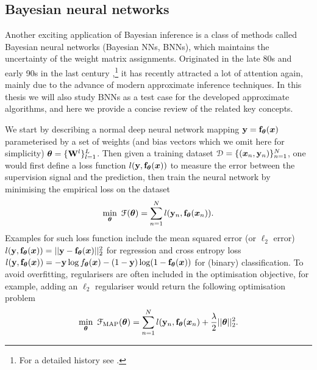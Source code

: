 \subsection{Bayesian neural networks}
\label{sec:chap2_bnn}
Another exciting application of Bayesian inference is a class of methods called Bayesian neural networks (Bayesian NNs, BNNs), which maintains the uncertainty of the weight matrix assignments. Originated in the late 80s and early 90s in the last century \citep{peterson:mean_field1987, mackay:practical1992, neal:bnn1992, hinton:mdl1993, neal:thesis1995},\footnote{For a detailed history see \citep[Section 2.2.1]{gal:uncertainty2016}.} it has recently attracted a lot of attention again, mainly due to the advance of modern approximate inference techniques. In this thesis we will also study BNNs as a test case for the developed approximate algorithms, and here we provide a concise review of the related key concepts. 

We start by describing a normal deep neural network mapping $\mathbf{y} = \mathbf{f}_{\bm{\theta}}(\bm{x})$ parameterised by a set of weights (and bias vectors which we omit here for simplicity) $\bm{\theta} = \{ \mathbf{W}^l \}_{l=1}^L$. Then given a training dataset $\mathcal{D} = \{ (\bm{x}_n, \mathbf{y}_n) \}_{n=1}^N$, one would first define a loss function $l(\mathbf{y}, \mathbf{f}_{\bm{\theta}}(\bm{x}))$ to measure the error between the supervision signal and the prediction, then train the neural network by minimising the empirical loss on the dataset
$$\min_{\bm{\theta}} \ \mathcal{F}(\bm{\theta}) = \sum_{n=1}^N l(\mathbf{y}_n, \mathbf{f}_{\bm{\theta}}(\bm{x}_n)).$$
Examples for such loss function include the mean squared error (or $\ell_2$ error) $l(\mathbf{y}, \mathbf{f}_{\bm{\theta}}(\bm{x})) = || \mathbf{y} - \mathbf{f}_{\bm{\theta}}(\bm{x}) ||_2^2 $ for regression and cross entropy loss $l(\mathbf{y}, \mathbf{f}_{\bm{\theta}}(\bm{x})) = -\mathbf{y} \log f_{\bm{\theta}}(\bm{x}) - (1 - \mathbf{y}) \log (1 - \mathbf{f}_{\bm{\theta}}(\bm{x}))$ for (binary) classification. To avoid overfitting, regularisers are often included in the optimisation objective, for example, adding an $\ell_2$ regulariser would return the following optimisation problem
\begin{equation}
\min_{\mparam} \ \mathcal{F}_{\text{MAP}}(\mparam) = \sum_{n=1}^N l(\y_n, \f_{\mparam}(\x_n) + \frac{\lambda}{2} || \mparam ||_2^2.
\label{eq:chap2_nn_map}
\end{equation}

